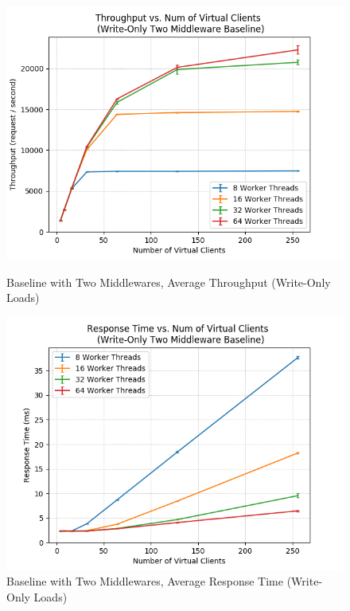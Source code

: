 \documentclass[11pt,a4paper]{article}
\begin{document}
\begin{figure}[H]
	\captionsetup{font=scriptsize,labelfont=scriptsize,justification=centering}
	\centering
	\begin{minipage}{0.5\textwidth}
		\centering
		\includegraphics[scale=0.525]{images/3b_two-mw_w-o_tps.png}
		\caption{Baseline with Two Middlewares, Average Throughput (Write-Only Loads)}
	\end{minipage}\hfill
	\begin{minipage}{0.5\textwidth}
		\centering
		\includegraphics[scale=0.525]{images/3b_two-mw_w-o_rt.png}
		\caption{Baseline with Two Middlewares, Average Response Time (Write-Only Loads)}
	\end{minipage}
\end{figure}
\end{document}
